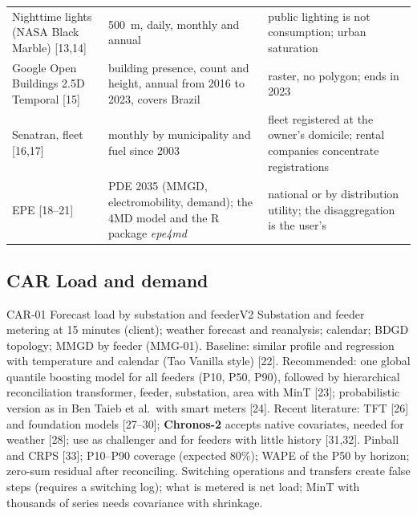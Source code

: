 \begin{table}[H]
\begin{tabularx}{\textwidth}{P{3.2cm} L P{4.2cm}}
Nighttime lights (NASA Black Marble) [13,14] & 500~m, daily, monthly and annual & public lighting is not consumption; urban saturation \\
Google Open Buildings 2.5D Temporal [15] & building presence, count and height, annual from 2016 to 2023, covers Brazil & raster, no polygon; ends in 2023 \\
Senatran, fleet [16,17] & monthly by municipality and fuel since 2003 & fleet registered at the owner's domicile; rental companies concentrate registrations \\
EPE [18--21] & PDE 2035 (MMGD, electromobility, demand); the 4MD model and the R package \emph{epe4md} & national or by distribution utility; the disaggregation is the user's \\
\bottomrule
\end{tabularx}
\end{table}

\subsection{CAR \textperiodcentered{} Load and demand}

\begin{ficha}{CAR-01 \textperiodcentered{} Forecast load by substation and feeder}{V2}
 Substation and feeder metering at 15 minutes (client);
weather forecast and reanalysis; calendar; BDGD topology; MMGD by
feeder (MMG-01).
 Baseline: similar profile and regression with
temperature and calendar (Tao Vanilla style) [22]. Recommended: one
global quantile boosting model for all feeders (P10, P50, P90),
followed by hierarchical reconciliation transformer, feeder,
substation, area with MinT [23]; probabilistic version as in Ben Taieb et
al.\ with smart meters [24]. Recent literature: TFT [26] and foundation
models [27--30]; \textbf{Chronos-2} accepts native covariates,
needed for weather [28]; use as challenger and for feeders with
little history [31,32].
 Pinball and CRPS [33]; P10--P90 coverage (expected 80\%);
WAPE of the P50 by horizon; zero-sum residual after reconciling.
 Switching operations and transfers create false steps (requires
a switching log); what is metered is net load; MinT with thousands of series needs
covariance with shrinkage.
\end{ficha}

